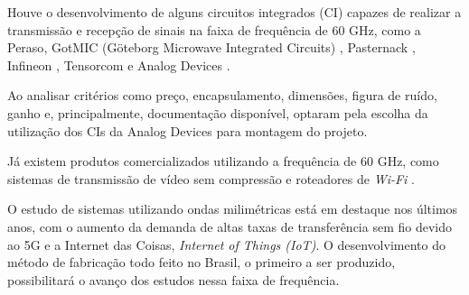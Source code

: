 Houve o desenvolvimento de alguns circuitos integrados (CI) capazes de realizar a transmissão e recepção de sinais na faixa de frequência de 60 GHz, como a Peraso\cite{Peraso}, GotMIC (Göteborg Microwave Integrated Circuits) \cite{gotmica}, Pasternack \cite{pasternack}, Infineon \cite{infineon}, Tensorcom \cite{tensorcom} e Analog Devices \cite{hmc6300}. 

Ao analisar critérios como preço, encapsulamento, dimensões, figura de ruído, ganho e, principalmente, documentação disponível, \citeauthor{TCC} optaram pela escolha da utilização dos CIs da Analog Devices para montagem do projeto.

Já existem produtos comercializados utilizando a frequência de 60 GHz, como sistemas de transmissão de vídeo sem compressão \cite{iogear} e roteadores de \textit{Wi-Fi} \cite{tplink}.

O estudo de sistemas utilizando ondas milimétricas está em destaque nos últimos anos, com o aumento da demanda de altas taxas de transferência sem fio devido ao 5G e a Internet das Coisas, \textit{Internet of Things (IoT)}. O desenvolvimento do método de fabricação todo feito no Brasil, o primeiro a ser produzido, possibilitará o avanço dos estudos nessa faixa de frequência.